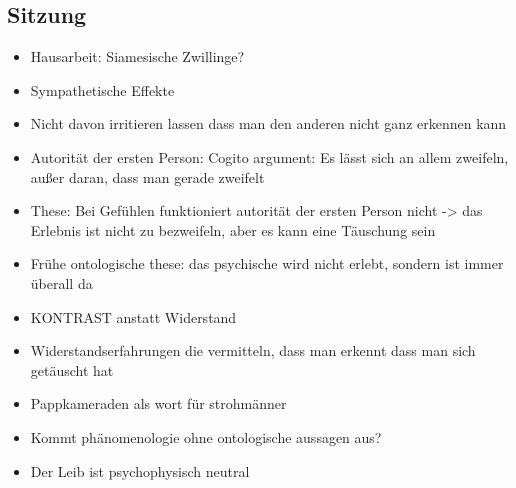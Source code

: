 \documentclass[emulatestandardclasses]{scrartcl}
\begin{document}
\subsection{Sitzung}

\begin{itemize}
  \item Hausarbeit: Siamesische Zwillinge?
  \item Sympathetische Effekte
  \item Nicht davon irritieren lassen dass man den anderen nicht ganz erkennen kann
  \item Autorität der ersten Person: Cogito argument: Es lässt sich an allem zweifeln, außer daran, dass man gerade zweifelt
  \item These: Bei Gefühlen funktioniert autorität der ersten Person nicht -> das Erlebnis ist nicht zu bezweifeln, aber es kann eine Täuschung sein
  \item Frühe ontologische these: das psychische wird nicht erlebt, sondern ist immer überall da
  \item KONTRAST anstatt Widerstand
  \item Widerstandserfahrungen die vermitteln, dass man erkennt dass man sich getäuscht hat
  \item Pappkameraden als wort für strohmänner
  \item Kommt phänomenologie ohne ontologische aussagen aus?
  \item Der Leib ist psychophysisch neutral
\end{itemize}


\newpage
%


\end{document}
